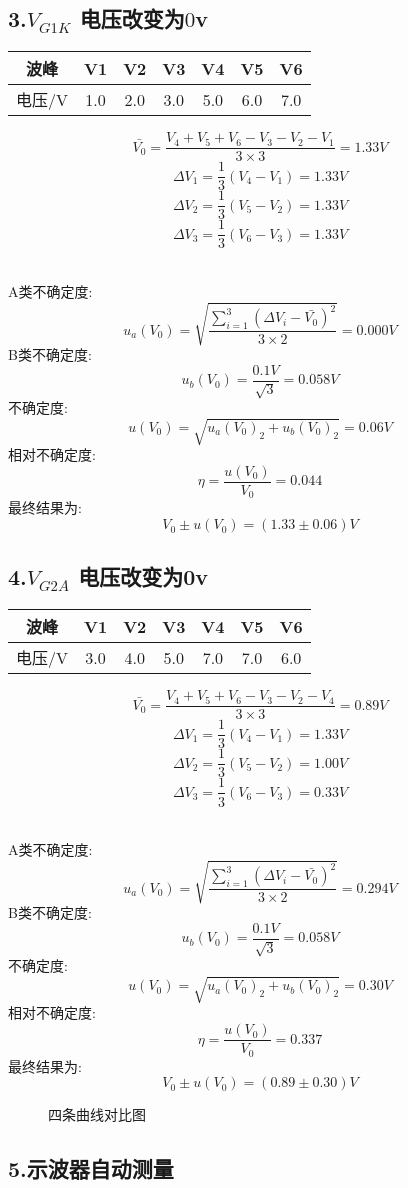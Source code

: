 \documentclass[11pt,a4paper,oneside]{article}
\begin{document}
\subsection*{3.$V_{G1K}$ 电压改变为$0$v}
\begin{center}
\begin{tabular}{|c|c|c|c|c|c|c|}
	\hline
	波峰&V1&V2&V3&V4&V5&V6
	\\\hline
	电压/V&1.0&2.0&3.0&5.0&6.0&7.0\\\hline
	\end{tabular}
	\end{center}

$$  \bar{V_0}=\frac{V_4+V_5+V_6-V_3-V_2-V_1}{3\times 3}=1.33V $$
$$	\Delta V_1=\frac{1}{3}(V_4-V_1)=1.33V $$
$$	\Delta V_2=\frac{1}{3}(V_5-V_2)=1.33V $$
$$	\Delta V_3=\frac{1}{3}(V_6-V_3)=1.33V $$ 

\ \\
A类不确定度:
$$	u_a(V_0)=\sqrt{\frac{\sum\limits_{i=1}^{3} (\Delta V_i-\bar{V_0})^2}{3\times 2}}=0.000V $$
B类不确定度:
$$	u_b(V_0)=\frac{0.1V}{\sqrt{3}}=0.058V $$
不确定度:
$$	u(V_0)=\sqrt{u_a(V_0)_2+u_b(V_0)_2}=0.06V $$
相对不确定度:
$$	\eta=\frac{u(V_0)}{V_0}=0.044 $$
最终结果为:
$$	V_0 \pm u(V_0) = (1.33 \pm 0.06)V $$


\subsection*{4.$V_{G2A}$ 电压改变为0v}
\begin{center}
\begin{tabular}{|c|c|c|c|c|c|c|}
	\hline
	波峰&V1&V2&V3&V4&V5&V6
	\\\hline
	电压/V&3.0&4.0&5.0&7.0&7.0&6.0\\\hline
	\end{tabular}
	\end{center}

$$  \bar{V_0}=\frac{V_4+V_5+V_6-V_3-V_2-V_4}{3\times 3}=0.89V $$
$$	\Delta V_1=\frac{1}{3}(V_4-V_1)=1.33V $$
$$	\Delta V_2=\frac{1}{3}(V_5-V_2)=1.00V $$
$$	\Delta V_3=\frac{1}{3}(V_6-V_3)=0.33V $$ 

\ \\
A类不确定度:
$$	u_a(V_0)=\sqrt{\frac{\sum\limits_{i=1}^{3} (\Delta V_i-\bar{V_0})^2}{3\times 2}}=0.294V $$
B类不确定度:
$$	u_b(V_0)=\frac{0.1V}{\sqrt{3}}=0.058V $$
不确定度:
$$	u(V_0)=\sqrt{u_a(V_0)_2+u_b(V_0)_2}=0.30V $$
相对不确定度:
$$	\eta=\frac{u(V_0)}{V_0}=0.337 $$
最终结果为:
$$	V_0 \pm u(V_0) = (0.89 \pm 0.30)V $$


\begin{figure}[h]
	\centering
    \caption{四条曲线对比图}
	\end{figure}

\subsection*{5.示波器自动测量}
\end{document}
